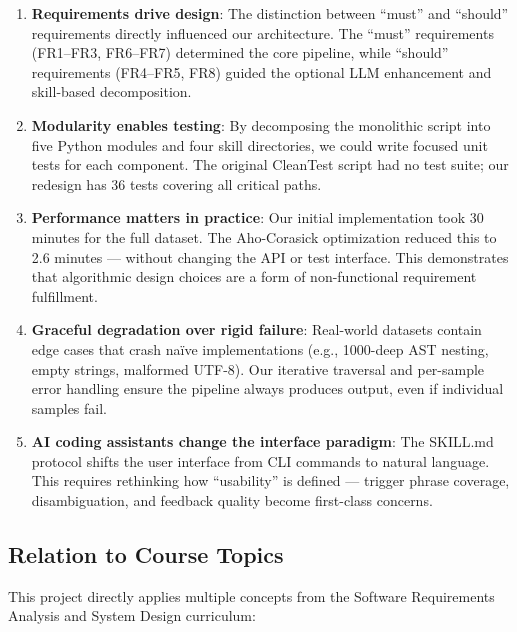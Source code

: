 \documentclass[acmlarge,nonacm,screen]{acmart}
\begin{document}
\begin{enumerate}
    \item \textbf{Requirements drive design}: The distinction between ``must'' and ``should'' requirements directly influenced our architecture. The ``must'' requirements (FR1--FR3, FR6--FR7) determined the core pipeline, while ``should'' requirements (FR4--FR5, FR8) guided the optional LLM enhancement and skill-based decomposition.

    \item \textbf{Modularity enables testing}: By decomposing the monolithic script into five Python modules and four skill directories, we could write focused unit tests for each component. The original CleanTest script had no test suite; our redesign has 36 tests covering all critical paths.

    \item \textbf{Performance matters in practice}: Our initial implementation took 30 minutes for the full dataset. The Aho-Corasick optimization reduced this to 2.6 minutes --- without changing the API or test interface. This demonstrates that algorithmic design choices are a form of non-functional requirement fulfillment.

    \item \textbf{Graceful degradation over rigid failure}: Real-world datasets contain edge cases that crash na\"ive implementations (e.g., 1000-deep AST nesting, empty strings, malformed UTF-8). Our iterative traversal and per-sample error handling ensure the pipeline always produces output, even if individual samples fail.

    \item \textbf{AI coding assistants change the interface paradigm}: The SKILL.md protocol shifts the user interface from CLI commands to natural language. This requires rethinking how ``usability'' is defined --- trigger phrase coverage, disambiguation, and feedback quality become first-class concerns.
\end{enumerate}

\subsection{Relation to Course Topics}

This project directly applies multiple concepts from the Software Requirements Analysis and System Design curriculum:
\end{document}
